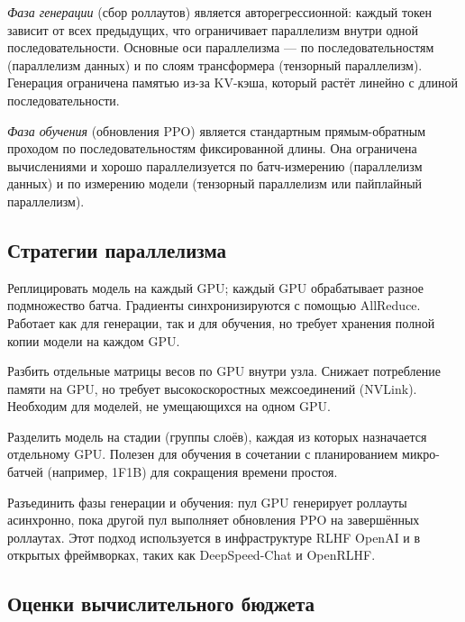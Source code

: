 \emph{Фаза генерации} (сбор роллаутов) является авторегрессионной: каждый токен зависит от всех предыдущих, что ограничивает параллелизм внутри одной последовательности. Основные оси параллелизма --- по последовательностям (параллелизм данных) и по слоям трансформера (тензорный параллелизм). Генерация ограничена памятью из-за KV-кэша, который растёт линейно с длиной последовательности.

\emph{Фаза обучения} (обновления PPO) является стандартным прямым-обратным проходом по последовательностям фиксированной длины. Она ограничена вычислениями и хорошо параллелизуется по батч-измерению (параллелизм данных) и по измерению модели (тензорный параллелизм или пайплайный параллелизм).

\subsection{Стратегии параллелизма}

\begin{description}[leftmargin=!,labelwidth=3.5cm]
  \item[Параллелизм данных] Реплицировать модель на каждый GPU; каждый GPU обрабатывает разное подмножество батча. Градиенты синхронизируются с помощью AllReduce. Работает как для генерации, так и для обучения, но требует хранения полной копии модели на каждом GPU.
  \item[Тензорный параллелизм] Разбить отдельные матрицы весов по GPU внутри узла. Снижает потребление памяти на GPU, но требует высокоскоростных межсоединений (NVLink). Необходим для моделей, не умещающихся на одном GPU.
  \item[Пайплайный параллелизм] Разделить модель на стадии (группы слоёв), каждая из которых назначается отдельному GPU. Полезен для обучения в сочетании с планированием микро-батчей (например, 1F1B) для сокращения времени простоя.
  \item[Асинхронная генерация роллаутов] Разъединить фазы генерации и обучения: пул GPU генерирует роллауты асинхронно, пока другой пул выполняет обновления PPO на завершённых роллаутах. Этот подход используется в инфраструктуре RLHF OpenAI и в открытых фреймворках, таких как DeepSpeed-Chat и OpenRLHF.
\end{description}

\subsection{Оценки вычислительного бюджета}
\label{sec:compute-budgets}

